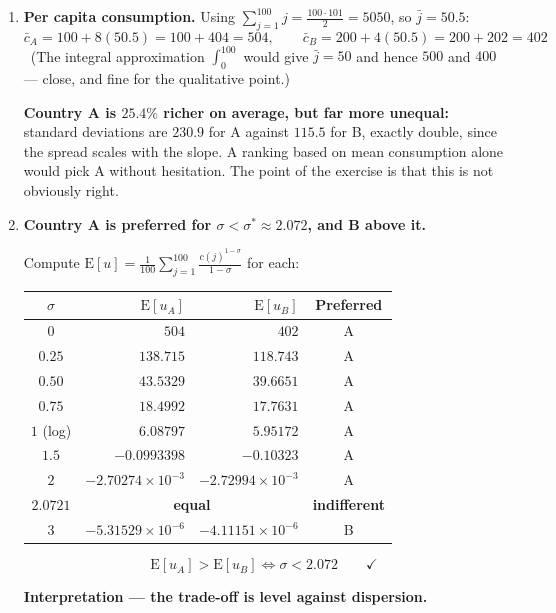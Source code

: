 \documentclass[12pt, letterpaper]{article}
\newcommand{\E}{\mathrm{E}}
\begin{document}
\begin{tcolorbox}[evenbox,title={Problem 2.8 \quad Inequality and Risk Aversion}]
\begin{enumerate}
\item \textbf{Per capita consumption.} Using $\sum_{j=1}^{100} j = \frac{100\cdot 101}{2} = 5050$,
so $\bar j = 50.5$:
$$\bar c_A = 100 + 8(50.5) = 100 + 404 = \boxed{504}, \qquad
\bar c_B = 200 + 4(50.5) = 200 + 202 = \boxed{402}$$
\checkmark\ (The integral approximation $\int_0^{100}$ would give $\bar j = 50$ and hence
$500$ and $400$ --- close, and fine for the qualitative point.)

\textbf{Country A is $25.4\%$ richer on average, but far more unequal:} standard deviations
are $230.9$ for A against $115.5$ for B, exactly double, since the spread scales with the
slope. A ranking based on mean consumption alone would pick A without hesitation. The point of
the exercise is that this is not obviously right.

\item \textbf{Country A is preferred for $\sigma < \sigma^{\ast} \approx 2.072$, and B
above it.}

Compute $\E[u] = \frac{1}{100}\sum_{j=1}^{100} \frac{c(j)^{1-\sigma}}{1-\sigma}$ for each:

\begin{center}
\begin{tabular}{crrc}
\toprule
$\sigma$ & $\E[u_A]$ & $\E[u_B]$ & Preferred \\
\midrule
$0$    & $504$ & $402$ & A \\
$0.25$ & $138.715$ & $118.743$ & A \\
$0.50$ & $43.5329$ & $39.6651$ & A \\
$0.75$ & $18.4992$ & $17.7631$ & A \\
$1$ (log) & $6.08797$ & $5.95172$ & A \\
$1.5$  & $-0.0993398$ & $-0.10323$ & A \\
$2$    & $-2.70274\!\times\!10^{-3}$ & $-2.72994\!\times\!10^{-3}$ & A \\
$\mathbf{2.0721}$ & \multicolumn{2}{c}{\textbf{equal}} & \textbf{indifferent} \\
$3$    & $-5.31529\!\times\!10^{-6}$ & $-4.11151\!\times\!10^{-6}$ & B \\
\bottomrule
\end{tabular}
\end{center}
$$\boxed{\E[u_A] > \E[u_B] \iff \sigma < 2.072} \qquad \checkmark$$

\textbf{Interpretation --- the trade-off is level against dispersion.}


\end{enumerate}
\end{tcolorbox}
\end{document}
